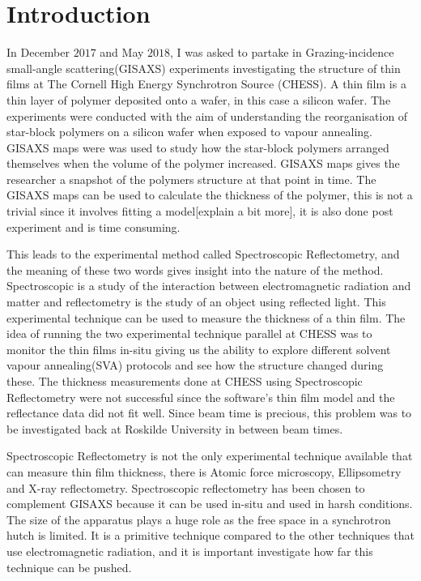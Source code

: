 \documentclass[MasterThesisMain.tex]{subfiles}
\begin{document}
	\chapter{Introduction}
	
In December $2017$ and May $2018$, I was asked to partake in Grazing-incidence small-angle scattering(GISAXS) experiments investigating the structure of thin films at The Cornell High Energy Synchrotron Source (CHESS). A thin film is a thin layer of polymer deposited onto a wafer, in this case a silicon wafer. The experiments were conducted with the aim of understanding the reorganisation of star-block polymers on a silicon wafer when exposed to vapour annealing. GISAXS maps were was used to study how the star-block polymers arranged themselves when the volume of the polymer increased. GISAXS maps gives the researcher a snapshot of the polymers structure at that point in time. The GISAXS maps can be used to calculate the thickness of the polymer, this is not a trivial since it involves fitting a model[explain a bit more], it is also done post experiment and is time consuming. 

This leads to the experimental method called Spectroscopic Reflectometry, and the meaning of these two words gives insight into the nature of the method. Spectroscopic is a study of the interaction between electromagnetic radiation and matter \cite{levinechemistry} and reflectometry is the study of an object using reflected light. This experimental technique can be used to measure the thickness of a thin film. The idea of running the two experimental technique parallel at CHESS was to monitor the thin films in-situ giving us the ability to explore different solvent vapour annealing(SVA) protocols and see how the structure changed during these. The thickness measurements done at CHESS using Spectroscopic Reflectometry were not successful since the software's thin film model and the reflectance data did not fit well. Since beam time is precious, this problem was to be investigated back at Roskilde University in between beam times.

Spectroscopic Reflectometry is not the only experimental technique available that can measure thin film thickness, there is Atomic force microscopy, Ellipsometry and X-ray reflectometry. Spectroscopic reflectometry has been chosen to complement GISAXS because it can be used in-situ and used in harsh conditions. The size of the apparatus plays a huge role as the free space in a synchrotron hutch is limited. It is a primitive technique compared to the other techniques that use electromagnetic radiation, and it is important investigate how far this technique can be pushed.
\end{document}
